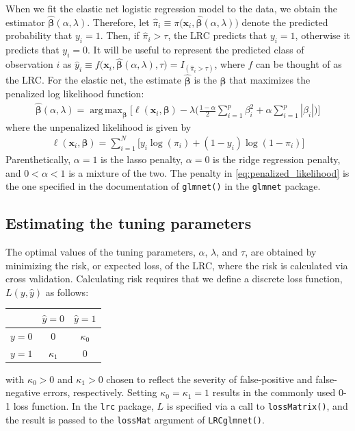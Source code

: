 \documentclass{article}
\DeclareMathOperator*{\argmax}{arg\,max}
\begin{document}
When we fit the elastic net logistic regression model to the data, we obtain the estimator 
$\hat{\boldsymbol\beta}(\alpha,\lambda)$.  Therefore, 
let $\hat\pi_i \equiv \pi \bigl( \mathbf{x}_i,\hat{\boldsymbol\beta}(\alpha,\lambda) \bigr)$ denote the predicted probability 
that $y_i = 1$.  Then, if $\hat\pi_i > \tau$, the LRC predicts that $y_i = 1$, otherwise it predicts that $y_i = 0$.  
It will be useful to represent the predicted class of observation
$i$ as $\hat{y}_i \equiv f \bigl( \mathbf{x}_i,\hat{\boldsymbol{\beta}}(\alpha,\lambda),\tau \bigr) = 
I_{(\hat\pi_i > \tau)}$, where $f$ can be thought of as the LRC.
For the elastic net, the estimate $\hat{\boldsymbol{\beta}}$ is the $\boldsymbol{\beta}$
that maximizes the penalized log likelihood function:
\begin{align}
\label{eq:penalized_likelihood}
\hat{\boldsymbol{\beta}}(\alpha,\lambda) = \argmax_{\boldsymbol{\beta}} \Biggl[ \ell(\mathbf{x}_i,\boldsymbol{\beta}) - \lambda 
\biggl( \frac{1-\alpha}{2} \sum_{i=1}^p \beta_i^2 + \alpha \sum_{i=1}^p |\beta_i| \biggr) \Biggr]
\end{align}
\noindent where the unpenalized likelihood is given by
\begin{align}
\ell(\mathbf{x}_i,\boldsymbol{\beta}) = \sum_{i=1}^N \bigl[ y_i \log(\pi_i) + (1 - y_i)\log(1-\pi_i) \bigr]
\end{align}
\noindent Parenthetically, $\alpha = 1$ is the lasso penalty, $\alpha = 0$ is the ridge regression penalty,
and $0 < \alpha < 1$ is a mixture of the two. The penalty in \eqref{eq:penalized_likelihood} is the one
specified in the documentation of {\tt glmnet()} in the {\tt glmnet} package.

\subsection{Estimating the tuning parameters}

The optimal values of the tuning parameters, $\alpha$, $\lambda$, and $\tau$, are obtained by minimizing 
the risk, or expected loss, of 
the LRC, where the risk is calculated via cross validation.  Calculating risk requires that we define a discrete 
loss function, $L(y,\hat{y})$ as follows:
\begin{table}[H]
\begin{center}
\begin{tabular}{c|cc}
& $\hat{y} = 0$ & $\hat{y} = 1$ \\
\hline
$y = 0$ & $0$ & $\kappa_0$ \\
$y = 1$ & $\kappa_1$ & $0$ \\
\end{tabular}
\end{center}
\end{table}
\noindent with $\kappa_0 > 0$ and $\kappa_1 > 0$ chosen to reflect the severity of false-positive and 
false-negative errors, respectively.  Setting $\kappa_0 = \kappa_1 = 1$ results in the commonly used 0-1 loss
function.  In the {\tt lrc} package, $L$ is specified via a call to {\tt lossMatrix()}, and the result is passed to
the {\tt lossMat} argument of {\tt LRCglmnet()}.
\end{document}

